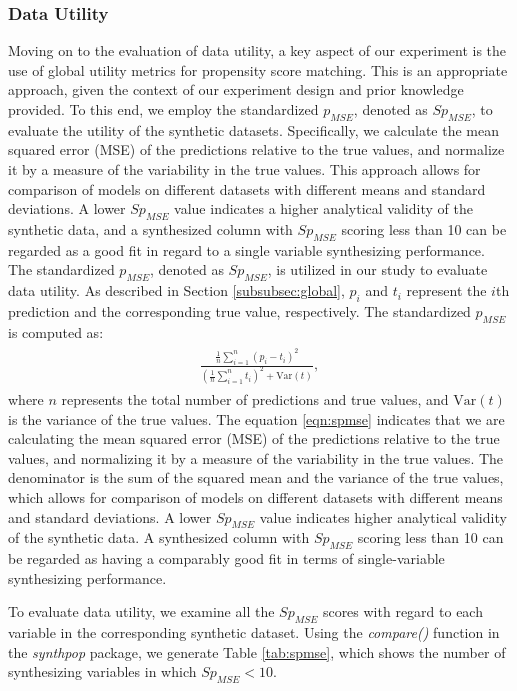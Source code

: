 \subsubsection{Data Utility}
\label{subsubsec:datautility}
Moving on to the evaluation of data utility, a key aspect of our experiment is the use of global utility metrics for propensity score matching. This is an appropriate approach, given the context of our experiment design and prior knowledge provided. To this end, we employ the standardized $p_{MSE}$, denoted as $Sp_{MSE}$, to evaluate the utility of the synthetic datasets. Specifically, we calculate the mean squared error (MSE) of the predictions relative to the true values, and normalize it by a measure of the variability in the true values. This approach allows for comparison of models on different datasets with different means and standard deviations. A lower $Sp_{MSE}$ value indicates a higher analytical validity of the synthetic data, and a synthesized column with $Sp_{MSE}$ scoring less than 10 can be regarded as a good fit in regard to a single variable synthesizing performance. The standardized $p_{MSE}$, denoted as $Sp_{MSE}$, is utilized in our study to evaluate data utility. As described in Section \ref{subsubsec:global}, $p_i$ and $t_i$ represent the $i$th prediction and the corresponding true value, respectively. The standardized $p_{MSE}$ is computed as:
\begin{align}
\label{eqn:spmse}
\begin{split}
    \frac{\frac{1}{n} \sum_{i=1}^n (p_i - t_i)^2}{\left(\frac{1}{n} \sum_{i=1}^n t_i\right)^2 + \text{Var}(t)},
\end{split}
\end{align}
where $n$ represents the total number of predictions and true values, and $\text{Var}(t)$ is the variance of the true values. The equation \eqref{eqn:spmse} indicates that we are calculating the mean squared error (MSE) of the predictions relative to the true values, and normalizing it by a measure of the variability in the true values. The denominator is the sum of the squared mean and the variance of the true values, which allows for comparison of models on different datasets with different means and standard deviations. A lower $Sp_{MSE}$ value indicates higher analytical validity of the synthetic data. A synthesized column with $Sp_{MSE}$ scoring less than 10 can be regarded as having a comparably good fit in terms of single-variable synthesizing performance.

To evaluate data utility, we examine all the $Sp_{MSE}$ scores with regard to each variable in the corresponding synthetic dataset. Using the \textit{compare()} function in the \textit{synthpop} package, we generate Table \ref{tab:spmse}, which shows the number of synthesizing variables in which $Sp_{MSE}<10$.

